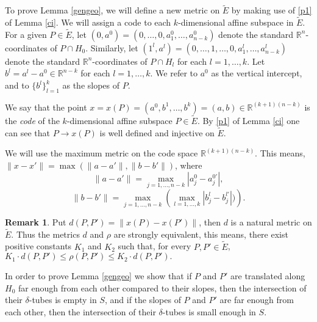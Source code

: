 \documentclass[a4paper]{amsart}
\theoremstyle{definition} \newtheorem{remark}[theorem]{Remark}
\def\rr{{\mathbb R}}
\def\R{{\mathbb R}}
\def\de{\delta}
\def\ti{\widetilde}
\begin{document}
To prove Lemma \ref{gengeo}, we will define a new metric on $\ti{E}$ by making use of \eqref{p1} of Lemma \ref{ci}.
We will assign a code to each $k$-dimensional affine subspace in $\ti{E}$. 
For a given $P \in \ti{E}$, let $(0,a^0)=(0,\dots,0,a_1^0,\dots, a_{n-k}^0)$ denote  
the standard $\R^n$-coordinates of $P \cap H_0$. 
Similarly, let $(1^l,a^l)=(0,\dots,1,\dots,0, a_1^l,\dots, a_{n-k}^l)$ denote 
the standard $\R^n$-coordinates of $P \cap H_l$ 
for each $l=1,\dots,k$. 
Let $b^l=a^l-a^0 \in \R^{n-k}$ for each $l=1,\dots,k$. 
We refer to $a^0$ as the vertical intercept, and to $\{b^l\}_{l=1}^k$ as the slopes of $P$. 

We say that the point $x=x(P)=(a^0,b^1,\dots,b^k)=(a,b) \in \rr^{(k+1)(n-k)}$ is the \emph{code} 
of the $k$-dimensional affine subspace $P \in \ti{E}$. 
By \eqref{p1} of Lemma \ref{ci} one can see that $P \to x(P)$ is well defined and injective on $\ti{E}$.%

We will use the maximum metric on the code space $\rr^{(k+1)(n-k)}$. 
This means, $\|x-x' \|=\max(\|a-a'\|, \|b-b'\|)$, where
$$\|a-a'\|=\max\limits_{j=1,\dots,n-k} |a_j^0-a_j^{0'}|,$$ 
\begin{equation}
\label{cb}
\|b-b'\|=\max\limits_{j=1,\dots,n-k} \left(\max\limits_{l=1,\dots,k} |b_j^l-b_j^{l'}|) \right). %
\end{equation}

\begin{remark}
\label{metric}
Put $d(P,P')=\|x(P)-x(P') \|$, then $d$ is a natural metric on $\ti{E}$. 
Thus the metrics $d$ and $\rho$ are strongly equivalent, this means, 
there exist positive constants $K_1$ and $K_2$ such that, for every $P,P' \in \ti{E}$,
$K_1 \cdot d(P,P')\leq \rho (P,P') \leq K_2 \cdot d(P,P').$
\end{remark}

%
In order to prove Lemma \ref{gengeo} we show that 
if $P$ and $P'$ are translated along $H_0$ far enough from each other  
compared to their slopes, then the intersection of their $\de$-tubes is empty in $S$, and 
if the slopes of $P$ and $P'$ are far enough from each other,  
then the intersection of their $\de$-tubes is small enough in $S$. 
\end{document}
